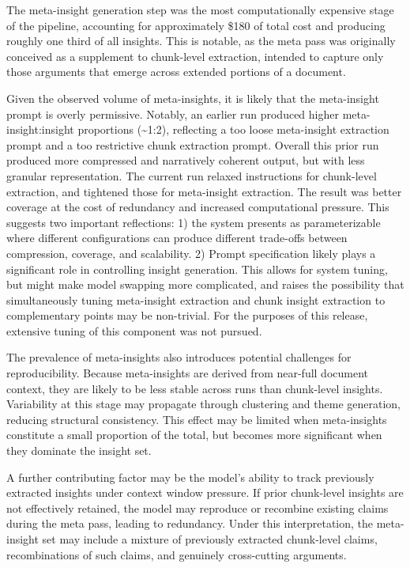 \documentclass[
  11pt,
]{article}
\begin{document}
The meta-insight generation step was the most computationally expensive
stage of the pipeline, accounting for approximately \$180 of total cost
and producing roughly one third of all insights. This is notable, as the
meta pass was originally conceived as a supplement to chunk-level
extraction, intended to capture only those arguments that emerge across
extended portions of a document.

Given the observed volume of meta-insights, it is likely that the
meta-insight prompt is overly permissive. Notably, an earlier run
produced higher meta-insight:insight proportions (\textasciitilde1:2),
reflecting a too loose meta-insight extraction prompt and a too
restrictive chunk extraction prompt. Overall this prior run produced
more compressed and narratively coherent output, but with less granular
representation. The current run relaxed instructions for chunk-level
extraction, and tightened those for meta-insight extraction. The result
was better coverage at the cost of redundancy and increased
computational pressure. This suggests two important reflections: 1) the
system presents as parameterizable where different configurations can
produce different trade-offs between compression, coverage, and
scalability. 2) Prompt specification likely plays a significant role in
controlling insight generation. This allows for system tuning, but might
make model swapping more complicated, and raises the possibility that
simultaneously tuning meta-insight extraction and chunk insight
extraction to complementary points may be non-trivial. For the purposes
of this release, extensive tuning of this component was not pursued.

The prevalence of meta-insights also introduces potential challenges for
reproducibility. Because meta-insights are derived from near-full
document context, they are likely to be less stable across runs than
chunk-level insights. Variability at this stage may propagate through
clustering and theme generation, reducing structural consistency. This
effect may be limited when meta-insights constitute a small proportion
of the total, but becomes more significant when they dominate the
insight set.

A further contributing factor may be the model's ability to track
previously extracted insights under context window pressure. If prior
chunk-level insights are not effectively retained, the model may
reproduce or recombine existing claims during the meta pass, leading to
redundancy. Under this interpretation, the meta-insight set may include
a mixture of previously extracted chunk-level claims, recombinations of
such claims, and genuinely cross-cutting arguments.
\end{document}
